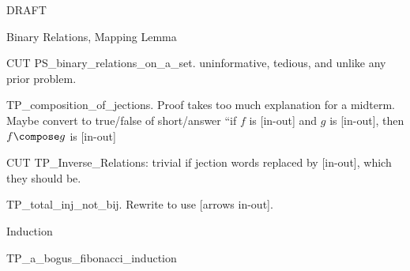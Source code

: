 \documentclass[quiz]{mcs}
\begin{document}


\examspace

\begin{center}
{\Large DRAFT}
\end{center}

\begin{center}
{\large Binary Relations, Mapping Lemma}
\end{center}


\begin{staffnotes}
CUT PS\_binary\_relations\_on\_a\_set.  uninformative, tedious, and unlike any prior problem.
\end{staffnotes}

\begin{staffnotes}
TP\_composition\_of\_jections. Proof takes too much explanation for a
midterm.  Maybe convert to true/false of short/answer ``if $f$ is
[in-out] and $g$ is [in-out], then $f \compose g$ is [in-out]
\end{staffnotes}


\begin{staffnotes}
CUT TP\_Inverse\_Relations: trivial if jection words replaced by
[in-out], which they should be.
\end{staffnotes}

\begin{staffnotes}
TP\_total\_inj\_not\_bij.  Rewrite to use [arrows in-out].
\end{staffnotes}

\begin{center}
{\large Induction}
\end{center}
\begin{staffnotes}
TP\_a\_bogus\_fibonacci\_induction
\end{staffnotes}
\end{document}
